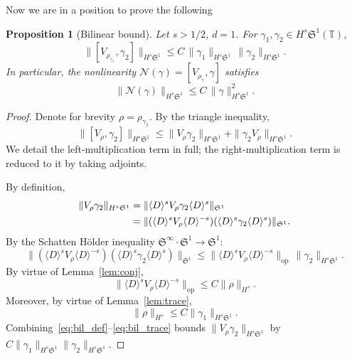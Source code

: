 \documentclass[11pt]{amsart}
\newtheorem{proposition}[theorem]{Proposition}
\theoremstyle{definition}
\newcommand{\T}{\mathbb{T}}
\newcommand{\Sp}{\mathfrak{S}}
\begin{document}
Now we are in a position to prove the following

\begin{proposition}[Bilinear bound]
\label{prop:bilinear}
Let $s>1/2$, $d=1$. For $\gamma_1,\gamma_2\in H^s\Sp^1(\T)$,
\begin{equation}\label{eq:bilinear}
  \|[V_{\rho_{\gamma_1}},\gamma_2]\|_{H^s\Sp^1}
  \le C\,\|\gamma_1\|_{H^s\Sp^1}
  \,\|\gamma_2\|_{H^s\Sp^1}.
\end{equation}
In particular, the nonlinearity $\mathcal{N}(\gamma)=[V_{\rho_\gamma},\gamma]$ satisfies
\begin{equation}\label{eq:nonlin_bound}
  \|\mathcal{N}(\gamma)\|_{H^s\Sp^1}
  \le C\,\|\gamma\|_{H^s\Sp^1}^2.
\end{equation}
\end{proposition}

\begin{proof}

Denote for brevity $\rho=\rho_{\gamma_1}.$ By the triangle inequality,
\[
  \|[V_{\rho},\gamma_2]\|_{H^s\Sp^1}
  \le \|V_{\rho}\gamma_2\|_{H^s\Sp^1}
  + \|\gamma_2 V_{\rho}\|_{H^s\Sp^1}.
\]
We detail the left-multiplication term in full; the right-multiplication term is reduced to it by taking adjoints.

By definition,
\begin{align}\label{eq:bil_def}
  \|V_\rho\gamma_2\|_{H^s\Sp^1}
  &= \|\langle D\rangle^s V_\rho\gamma_2
  \langle D\rangle^s\|_{\Sp^1}\notag\\
  &= \|(\langle D\rangle^s V_\rho
  \langle D\rangle^{-s})
  (\langle D\rangle^s\gamma_2
  \langle D\rangle^s)\|_{\Sp^1}.
\end{align}
By the Schatten H\"older inequality $\Sp^\infty\cdot\Sp^1\to\Sp^1$:
\begin{equation}\label{eq:bil_holder}
  \|(\langle D\rangle^s V_\rho
  \langle D\rangle^{-s})
  (\langle D\rangle^s\gamma_2
  \langle D\rangle^s)\|_{\Sp^1}
  \le \|\langle D\rangle^s V_\rho
  \langle D\rangle^{-s}\|_{\mathrm{op}}
  \,\|\gamma_2\|_{H^s\Sp^1}.
\end{equation}
By virtue of  Lemma~\ref{lem:conj},
\begin{equation}\label{eq:bil_conj}
  \|\langle D\rangle^s V_\rho
  \langle D\rangle^{-s}\|_{\mathrm{op}}
  \le C\|\rho\|_{H^s}.
\end{equation}
Moreover, by virtue of Lemma~\ref{lem:trace},
\begin{equation}\label{eq:bil_trace}
  \|\rho\|_{H^s}
  \le C\|\gamma_1\|_{H^s\Sp^1}.
\end{equation}
Combining~\eqref{eq:bil_def}--\eqref{eq:bil_trace} bounds $\|V_\rho\gamma_2\|_{H^s\Sp^1}$ by $C\|\gamma_1\|_{H^s\Sp^1}\|\gamma_2\|_{H^s\Sp^1}.$

\end{proof}
\end{document}
